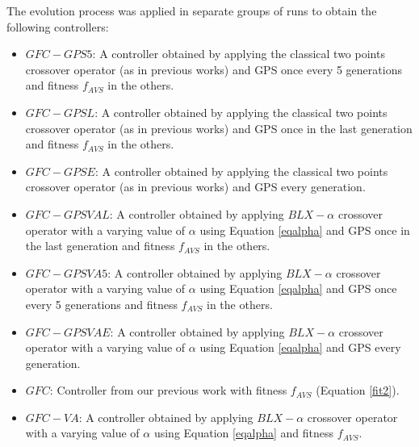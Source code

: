 \documentclass[10pt,journal,compsoc]{IEEEtran}
\begin{document}
The evolution process was applied in separate groups of runs to obtain
the following controllers: %
\begin{itemize}
	\item $GFC-GPS5$: A controller obtained by applying the
          classical two points crossover operator (as in previous
          works) and GPS once every 5 generations and fitness
          $f_{AVS}$ in the others. %
	\item $GFC-GPSL$: A controller obtained by applying the
          classical two points crossover operator (as in previous
          works) and GPS once in the last generation and fitness
          $f_{AVS}$ in the others. %
	\item $GFC-GPSE$: A controller obtained by applying the classical two points crossover operator (as in previous works) and GPS every generation. 

	\item $GFC-GPSVAL$: A controller obtained by applying $BLX-\alpha$ crossover operator with a varying value of $\alpha$ using Equation \ref{eqalpha} and GPS once in the last generation and fitness $f_{AVS}$ in the others. 

	\item $GFC-GPSVA5$: A controller obtained by applying $BLX-\alpha$ crossover operator with a varying value of $\alpha$ using Equation \ref{eqalpha} and GPS once every 5 generations and fitness $f_{AVS}$ in the others. 

	\item $GFC-GPSVAE$: A controller obtained by applying $BLX-\alpha$ crossover operator with a varying value of $\alpha$ using Equation \ref{eqalpha} and GPS every generation. 

        \item $GFC$: Controller  from our previous work \cite{salem_cig2018} with fitness  $f_{AVS}$ (Equation \ref{fit2}).
	\item $GFC-VA$: A controller obtained by applying $BLX-\alpha$
          crossover operator with a varying value of $\alpha$ using
          Equation \ref{eqalpha} and fitness $f_{AVS}$. %
\end{itemize}
\end{document}

